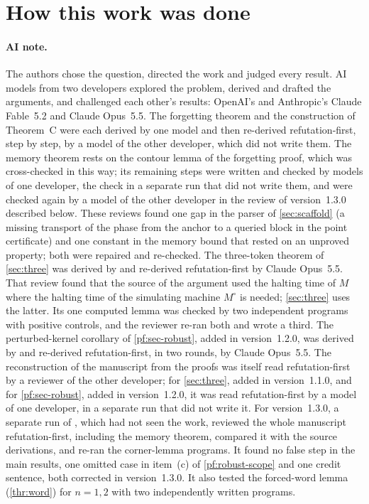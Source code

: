 \section*{How this work was done}

\paragraph{AI note.} The authors chose the question, directed the work and judged every result. AI models from two developers explored the problem, derived and drafted the arguments, and challenged each other's results: OpenAI's \OPENAIMODEL{} and Anthropic's Claude Fable~5.2 and Claude Opus~5.5. The forgetting theorem and the construction of Theorem~C were each derived by one model and then re-derived refutation-first, step by step, by a model of the other developer, which did not write them. The memory theorem rests on the contour lemma of the forgetting proof, which was cross-checked in this way; its remaining steps were written and checked by models of one developer, the check in a separate run that did not write them, and were checked again by a model of the other developer in the review of version~1.3.0 described below. These reviews found one gap in the parser of \cref{sec:scaffold} (a missing transport of the phase from the anchor to a queried block in the point certificate) and one constant in the memory bound that rested on an unproved property; both were repaired and re-checked. The three-token theorem of \cref{sec:three} was derived by \OPENAIMODEL{} and re-derived refutation-first by Claude Opus~5.5. That review found that the source of the argument used the halting time of $M$ where the halting time of the simulating machine $M^\circ$ is needed; \cref{sec:three} uses the latter. Its one computed lemma was checked by two independent programs with positive controls, and the reviewer re-ran both and wrote a third. The perturbed-kernel corollary of \cref{pf:sec-robust}, added in version~1.2.0, was derived by \OPENAIMODEL{} and re-derived refutation-first, in two rounds, by Claude Opus~5.5. The reconstruction of the manuscript from the proofs was itself read refutation-first by a reviewer of the other developer; for \cref{sec:three}, added in version~1.1.0, and for \cref{pf:sec-robust}, added in version~1.2.0, it was read refutation-first by a model of one developer, in a separate run that did not write it. For version~1.3.0, a separate run of \OPENAIMODEL{}, which had not seen the work, reviewed the whole manuscript refutation-first, including the memory theorem, compared it with the source derivations, and re-ran the corner-lemma programs. It found no false step in the main results, one omitted case in item~(c) of \cref{pf:robust-scope} and one credit sentence, both corrected in version~1.3.0. It also tested the forced-word lemma (\cref{thr:word}) for $n=1,2$ with two independently written programs.

